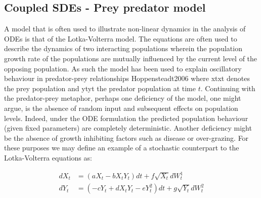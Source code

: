 \documentclass[a4paper,11pt]{article}\usepackage[]{graphicx}\usepackage[]{color}
\begin{document}
\subsection{Coupled SDEs - Prey predator model}
A model that is often used to illustrate non-linear dynamics in the analysis of ODEs is that of the Lotka-Volterra model. The equations are often used to describe the dynamics of two interacting populations wherein the population growth rate of the populations are mutually influenced by the current level of the opposing population. As such the model has been used to explain oscillatory behaviour in predator-prey relationships {Hoppensteadt2006} where xtxt denotes the prey population and ytyt the predator population at time $t$. Continuing with the predator-prey metaphor, perhaps one deficiency of the model, one might argue, is the absence of random input and subsequent effects on population levels. Indeed, under the ODE formulation the predicted population behaviour (given fixed parameters) are completely deterministic. Another deficiency might be the absence of growth inhibiting factors such as disease or over-grazing. For these purposes we may define an example of a stochastic counterpart to the Lotka-Volterra equations as:

\begin{align*}
dX_t & = (aX_t - bX_t Y_t) dt + f \sqrt{X_t} dW^1_t \\
dY_t & = (-cY_t + dX_t Y_t - eY^2_t)dt + g \sqrt{Y_t} dW^2_t
\end{align*}
\end{document}
